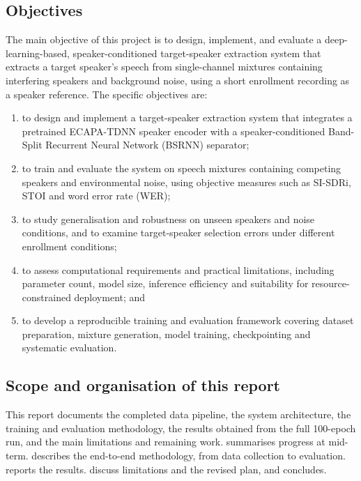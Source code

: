 \documentclass[11pt,a4paper]{article}
\newcommand{\sisdri}{SI-SDRi}
\begin{document}
\subsection{Objectives}
The main objective of this project is to design, implement, and evaluate a deep-learning-based,
speaker-conditioned target-speaker extraction system that extracts a target speaker's speech from
single-channel mixtures containing interfering speakers and background noise, using a short
enrollment recording as a speaker reference. The specific objectives are:
\begin{enumerate}
  \item to design and implement a target-speaker extraction system that integrates a pretrained
        ECAPA-TDNN speaker encoder with a speaker-conditioned Band-Split Recurrent Neural Network
        (BSRNN) separator;
  \item to train and evaluate the system on speech mixtures containing competing speakers and
        environmental noise, using objective measures such as \sisdri, STOI and word error rate
        (WER);
  \item to study generalisation and robustness on unseen speakers and noise conditions, and to
        examine target-speaker selection errors under different enrollment conditions;
  \item to assess computational requirements and practical limitations, including parameter
        count, model size, inference efficiency and suitability for resource-constrained
        deployment; and
  \item to develop a reproducible training and evaluation framework covering dataset preparation,
        mixture generation, model training, checkpointing and systematic evaluation.
\end{enumerate}

\subsection{Scope and organisation of this report}
This report documents the completed data pipeline, the system architecture, the training and
evaluation methodology, the results obtained from the full 100-epoch run, and the main limitations
and remaining work.  summarises progress at mid-term.  describes
the end-to-end methodology, from data collection to evaluation.  reports the
results.  discuss limitations and the revised plan, and
 concludes.
\end{document}
